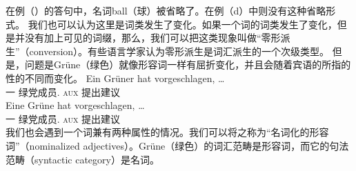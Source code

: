 \noindent
在例（）的答句中，名词ball（球）被省略了。在例（d）中则没有这种省略形式。
我们也可以认为这里是词类发生了变化。如果一个词的词类发生了变化，但是并没有加上可见的词缀，那么，我们可以把这类现象叫做“零形派生”（conversion）。有些语言学家认为零形派生是词汇派生的一个次级类型。
但是，问题是Grüne（绿色）就像形容词一样有屈折变化，并且会随着宾语的所指的性的不同而变化。
\eal
\ex 
\gll Ein Grüner hat vorgeschlagen, \ldots\\
	 一 绿党成员.\mas{} \textsc{aux} 提出建议\\
\ex 
\gll Eine Grüne hat vorgeschlagen, \ldots\\
	 一 绿党成员.\fem{} \textsc{aux} 提出建议\\
\zl
我们也会遇到一个词兼有两种属性的情况。我们可以将之称为“名词化的形容词”（nominalized adjectives）。Grüne（绿色）的词汇范畴是形容词，而它的句法范畴（syntactic category）是名词。

